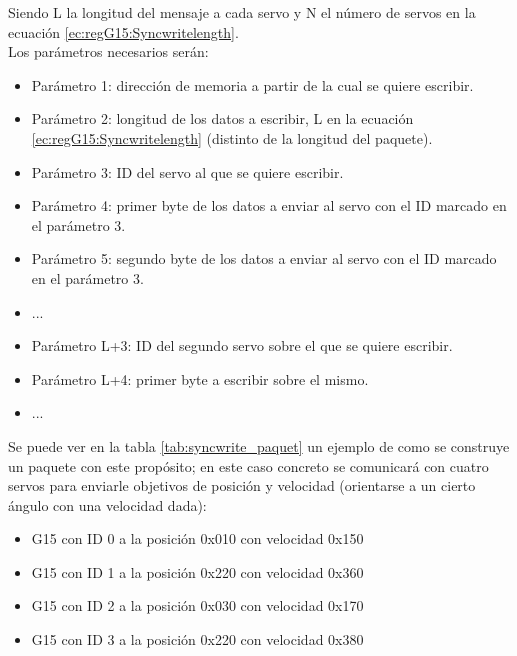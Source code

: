		Siendo L la longitud del mensaje a cada servo y N el número de servos en la ecuación \ref{ec:regG15:Syncwritelength}.
		\\ 
		
		Los parámetros necesarios serán:
		\\ 
		
		\begin{itemize}
			\item Parámetro 1: dirección de memoria a partir de la cual se quiere escribir.
			\item Parámetro 2: longitud de los datos a escribir, L en la ecuación \ref{ec:regG15:Syncwritelength} (distinto de la longitud del paquete).
			\item Parámetro 3: ID del servo al que se quiere escribir.
			\item Parámetro 4: primer byte de los datos a enviar al servo con el ID marcado en el parámetro 3.
			\item Parámetro 5: segundo byte de los datos a enviar al servo con el ID marcado en el parámetro 3.
			\item ...
			\item Parámetro L+3: ID del segundo servo sobre el que se quiere escribir.
			\item Parámetro L+4: primer byte a escribir sobre el mismo.
			\item ...
		\end{itemize}
		
		Se puede ver en la tabla \ref{tab:syncwrite_paquet} un ejemplo de como se construye un paquete con este propósito; en este caso concreto se comunicará con cuatro servos para enviarle objetivos de posición y velocidad (orientarse a un cierto ángulo con una velocidad dada):
		\\ 
		
		\begin{itemize}
			\item G15 con ID 0 a la posición 0x010 con velocidad 0x150
			\item G15 con ID 1 a la posición 0x220 con velocidad 0x360
			\item G15 con ID 2 a la posición 0x030 con velocidad 0x170
			\item G15 con ID 3 a la posición 0x220 con velocidad 0x380
		\end{itemize}
			
